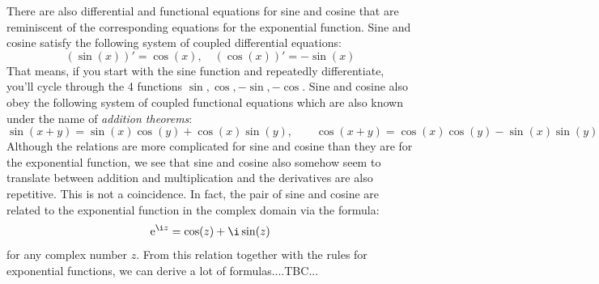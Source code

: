 There are also differential and functional equations for sine and cosine that are reminiscent of the corresponding equations for the exponential function. Sine and cosine satisfy the following system of coupled differential equations:
\begin{equation}
(\sin(x))' =  \cos(x), \quad
(\cos(x))' = -\sin(x)
\end{equation}
That means, if you start with the sine function and repeatedly differentiate, you'll cycle through the 4 functions $\sin, \cos, -\sin, -\cos$. Sine and cosine also obey the following system of coupled functional equations which are also known under the name of \emph{addition theorems}:
\begin{equation}
\sin(x+y) = \sin(x) \cos(y) + \cos(x) \sin(y), \qquad
\cos(x+y) = \cos(x) \cos(y) - \sin(x) \sin(y)
\end{equation}
Although the relations are more complicated for sine and cosine than they are for the exponential function, we see that sine and cosine also somehow seem to translate between addition and multiplication and the derivatives are also repetitive. This is not a coincidence. In fact, the pair of sine and cosine are related to the exponential function in the complex domain via the formula:
\begin{equation}
\e^{\i z} = \cos(z) + \i \sin(z)
\end{equation}
for any complex number $z$. From this relation together with the rules for exponential functions, we can derive a lot of formulas....TBC...





